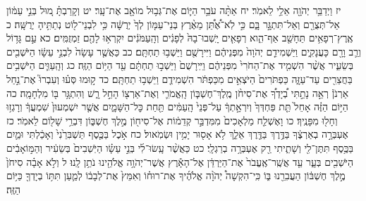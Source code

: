 \documentclass[twoside, openany, parskip=half, 11pt]{book}
\begin{document}
יז וַיְדַבֵּ֥ר יְהֹוָ֖ה אֵלַ֥י לֵאמֹֽר׃ יח אַתָּ֨ה עֹבֵ֥ר הַיּ֛וֹם אֶת־גְּב֥וּל מוֹאָ֖ב אֶת־עָֽר׃ יט וְקָרַבְתָּ֗ מ֚וּל בְּנֵ֣י עַמּ֔וֹן אַל־תְּצֻרֵ֖ם וְאַל־תִּתְגָּ֣ר בָּ֑ם כִּ֣י לֹֽא־אֶ֠תֵּ֠ן מֵאֶ֨רֶץ בְּנֵי־עַמּ֤וֹן לְךָ֙ יְרֻשָּׁ֔ה כִּ֥י לִבְנֵי־ל֖וֹט נְתַתִּ֥יהָ יְרֻשָּֽׁה׃ כ אֶֽרֶץ־רְפָאִ֥ים תֵּחָשֵׁ֖ב אַף־הִ֑וא רְפָאִ֤ים יָֽשְׁבוּ־בָהּ֙ לְפָנִ֔ים וְהָֽעַמֹּנִ֔ים יִקְרְא֥וּ לָהֶ֖ם זַמְזֻמִּֽים׃ כא עַ֣ם גָּד֥וֹל וְרַ֛ב וָרָ֖ם כָּעֲנָקִ֑ים וַיַּשְׁמִידֵ֤ם יְהֹוָה֙ מִפְּנֵיהֶ֔ם וַיִּירָשֻׁ֖ם וַיֵּשְׁב֥וּ תַחְתָּֽם׃ כב כַּאֲשֶׁ֤ר עָשָׂה֙ לִבְנֵ֣י עֵשָׂ֔ו הַיֹּשְׁבִ֖ים בְּשֵׂעִ֑יר אֲשֶׁ֨ר הִשְׁמִ֤יד אֶת־הַחֹרִי֙ מִפְּנֵיהֶ֔ם וַיִּֽירָשֻׁם֙ וַיֵּשְׁב֣וּ תַחְתָּ֔ם עַ֖ד הַיּ֥וֹם הַזֶּֽה׃ כג וְהָֽעַוִּ֛ים הַיֹּשְׁבִ֥ים בַּחֲצֵרִ֖ים עַד־עַזָּ֑ה כַּפְתֹּרִים֙ הַיֹּצְאִ֣ים מִכַּפְתֹּ֔ר הִשְׁמִידֻ֖ם וַיֵּשְׁב֥וּ תַחְתָּֽם׃ כד ק֣וּמוּ סְּע֗וּ וְעִבְרוּ֮ אֶת־נַ֣חַל אַרְנֹן֒ רְאֵ֣ה נָתַ֣תִּי בְ֠יָדְךָ֠ אֶת־סִיחֹ֨ן מֶֽלֶךְ־חֶשְׁבּ֧וֹן הָֽאֱמֹרִ֛י וְאֶת־אַרְצ֖וֹ הָחֵ֣ל רָ֑שׁ וְהִתְגָּ֥ר בּ֖וֹ מִלְחָמָֽה׃ כה הַיּ֣וֹם הַזֶּ֗ה אָחֵל֙ תֵּ֤ת פַּחְדְּךָ֙ וְיִרְאָ֣תְךָ֔ עַל־פְּנֵי֙ הָֽעַמִּ֔ים תַּ֖חַת כׇּל־הַשָּׁמָ֑יִם אֲשֶׁ֤ר יִשְׁמְעוּן֙ שִׁמְעֲךָ֔ וְרָגְז֥וּ וְחָל֖וּ מִפָּנֶֽיךָ׃ כו וָאֶשְׁלַ֤ח מַלְאָכִים֙ מִמִּדְבַּ֣ר קְדֵמ֔וֹת אֶל־סִיח֖וֹן מֶ֣לֶךְ חֶשְׁבּ֑וֹן דִּבְרֵ֥י שָׁל֖וֹם לֵאמֹֽר׃ כז אֶעְבְּרָ֣ה בְאַרְצֶ֔ךָ בַּדֶּ֥רֶךְ בַּדֶּ֖רֶךְ אֵלֵ֑ךְ לֹ֥א אָס֖וּר יָמִ֥ין וּשְׂמֹֽאול׃ כח אֹ֣כֶל בַּכֶּ֤סֶף תַּשְׁבִּרֵ֙נִי֙ וְאָכַ֔לְתִּי וּמַ֛יִם בַּכֶּ֥סֶף תִּתֶּן־לִ֖י וְשָׁתִ֑יתִי רַ֖ק אֶעְבְּרָ֥ה בְרַגְלָֽי׃ כט כַּאֲשֶׁ֨ר עָֽשׂוּ־לִ֜י בְּנֵ֣י עֵשָׂ֗ו הַיֹּֽשְׁבִים֙ בְּשֵׂעִ֔יר וְהַמּ֣וֹאָבִ֔ים הַיֹּשְׁבִ֖ים בְּעָ֑ר עַ֤ד אֲשֶֽׁר־אֶֽעֱבֹר֙ אֶת־הַיַּרְדֵּ֔ן אֶל־הָאָ֕רֶץ אֲשֶׁר־יְהֹוָ֥ה אֱלֹהֵ֖ינוּ נֹתֵ֥ן לָֽנוּ׃ ל וְלֹ֣א אָבָ֗ה סִיחֹן֙ מֶ֣לֶךְ חֶשְׁבּ֔וֹן הַעֲבִרֵ֖נוּ בּ֑וֹ כִּֽי־הִקְשָׁה֩ יְהֹוָ֨ה אֱלֹהֶ֜יךָ אֶת־רוּח֗וֹ וְאִמֵּץ֙ אֶת־לְבָב֔וֹ לְמַ֛עַן תִּתּ֥וֹ בְיָדְךָ֖ כַּיּ֥וֹם הַזֶּֽה׃
\end{document}
